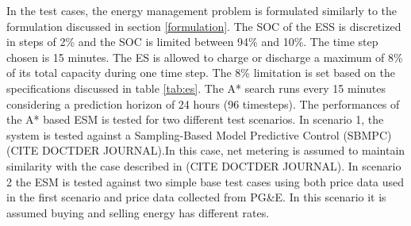 In the test cases, the energy management problem is formulated similarly to the formulation discussed in section \ref{formulation}. The  SOC of the ESS is discretized in steps of 2\% and the SOC is limited between  94\%  and  10\%. The time step chosen is 15 minutes. The ES is allowed to charge or discharge a maximum of 8\% of its total capacity during one time step. The 8\% limitation is set based on the specifications discussed in table \ref{tab:es}. The A* search runs every 15 minutes considering a prediction horizon of 24 hours (96 timesteps). The performances of the A* based ESM is tested for two different test scenarios. In scenario 1, the system is tested against a Sampling-Based Model Predictive Control (SBMPC) \colorbox{BurntOrange}{(CITE DOCTDER JOURNAL)}.In this case, net metering is assumed to maintain similarity with the case described in \colorbox{BurntOrange}{(CITE DOCTDER JOURNAL)}. In scenario 2 the ESM is tested against two simple base test cases using both price data used in the first scenario and price data collected from PG\&E. In this scenario it is assumed buying and selling energy has different rates.

